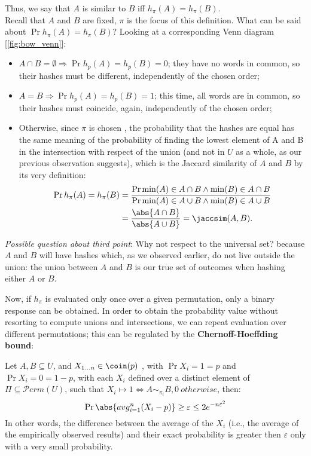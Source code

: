 	Thus, we say that $A$ is similar to $B$ iff $h_\pi(A)=h_\pi(B)$.\\
	Recall that $A$ and $B$ are fixed, $\pi$ is the focus of this definition. What can be said about $\Pr{h_\pi(A)=h_\pi(B)}$? Looking at a corresponding Venn diagram [\ref{fig:bow_venn}]:
	\begin{itemize}
	\item $A \cap B = \emptyset \Rightarrow \Pr{h_p(A)=h_p(B)} = 0$; they have no words in common, so their hashes must be different, independently of the chosen order;
	\item $A = B \Rightarrow \Pr{h_p(A)=h_p(B)} = 1$; this time, all words are in common, so their hashes must coincide, again, independently of the chosen order;
	\item Otherwise, since $\pi$ is chosen \uar, the probability that the hashes are equal has the same meaning of the probability of finding the lowest element of A and B in the intersection with respect of the union (and not in $U$ as a whole, as our previous observation suggests), which is the Jaccard similarity of $A$ and $B$ by its very definition:
	\begin{align*}
		\Pr{h_\pi(A)=h_\pi(B)} &= \frac{\Pr{\min(A) \in A \cap B \wedge \min(B) \in A \cap B}}{\Pr{\min(A) \in A \cup B \wedge \min(B) \in A \cup B}}\\
		&= \frac{\abs{A \cap B}}{\abs{A \cup B}} = \jaccsim(A, B).
	\end{align*}
	\end{itemize}
	
	\textit{Possible question about third point}: Why not respect to the universal set? because $A$ and $B$ will have hashes which, as we observed earlier, do not live outside the union: the union between $A$ and $B$ is our true set of outcomes when hashing either $A$ or $B$.
	
	Now, if $h_\pi$ is evaluated only once over a given permutation, only a binary response can be obtained. In order to obtain the probability value without resorting to compute unions and intersections, we can repeat evaluation over different permutations; this can be regulated by the \textbf{Chernoff-Hoeffding bound}:
	
	Let $A, B \subseteq U$, and $X_{1 \dots n} \in \coin(p)$ \iid, with $\Pr{X_i=1}=p$ and $\Pr{X_i=0}=1-p$, with each $X_i$ defined over a distinct element of $\Pi \subseteq \mathcal{P}erm(U)$, such that $X_i \mapsto 1 \Leftrightarrow A \sim_{\pi_i} B, 0\ otherwise$, then:
	\begin{equation} \label{chernoff_hoeffding}
	\Pr{\abs{avg_{i=1}^{n}(X_i - p)}\geq\varepsilon} \leq 2e^{-n\varepsilon^2}
	\end{equation}
	In other words, the difference between the average of the $X_i$ (i.e., the average of the empirically observed results) and their exact probability is greater then $\varepsilon$ only with a very small probability.
	
